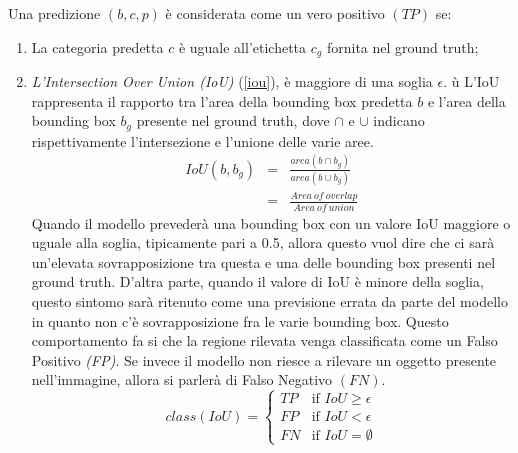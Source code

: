 Una predizione $(b,c,p)$ è considerata come un vero positivo $(TP)$ se:
\begin{enumerate}
    \item La categoria predetta $c$ è uguale all'etichetta $c_g$ fornita nel ground 
    truth;
    \item \emph{L'Intersection Over Union (IoU)} (\ref{iou}), è maggiore di una soglia $\epsilon$. ù
    L'IoU rappresenta il rapporto tra l'area della bounding box predetta 
    $b$ e l'area della bounding box $b_g$ presente nel ground truth, dove $\cap$ e 
    $\cup$ indicano rispettivamente l'intersezione e l'unione delle varie aree.
    \begin{eqnarray}\label{iou}
        IoU(b,b_g) & = & \frac{area(b \cap b_g)}{area(b \cup b_g)} \nonumber \\
                 & = & \frac{Area \ of \ overlap}{Area \ of \ union}
    \end{eqnarray}
    Quando il modello prevederà una bounding box con un valore IoU 
    maggiore o uguale alla soglia, tipicamente pari a 0.5, allora questo 
    vuol dire che ci sarà un'elevata sovrapposizione tra questa e una 
    delle bounding box presenti nel ground truth. D'altra parte, quando 
    il valore di IoU è minore della soglia, questo sintomo sarà ritenuto 
    come una previsione errata da parte del modello in quanto non c'è 
    sovrapposizione fra le varie bounding box. Questo comportamento 
    fa si che la regione rilevata venga classificata come un Falso Positivo 
    \emph{(FP)}. Se invece il modello non riesce a rilevare un oggetto presente 
    nell'immagine, allora si parlerà di Falso Negativo $(FN)$.
    \begin{equation}\label{iou values}
        class(IoU) = \left\{
            \begin{array}{rl}
            TP & \mbox{if } IoU \geq \epsilon \\
            FP & \mbox{if } IoU < \epsilon \\
            FN & \mbox{if } IoU = \emptyset
            \end{array}
            \right.
    \end{equation}
\end{enumerate}
